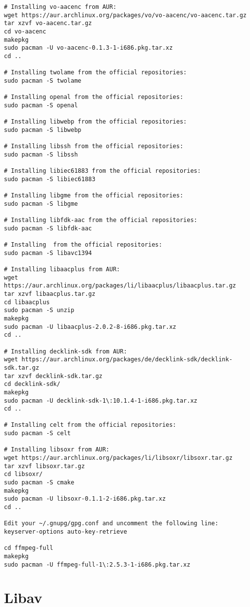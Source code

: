 \begin{itemize}
\begin{verbatim}
# Installing vo-aacenc from AUR:
wget https://aur.archlinux.org/packages/vo/vo-aacenc/vo-aacenc.tar.gz
tar xzvf vo-aacenc.tar.gz
cd vo-aacenc
makepkg
sudo pacman -U vo-aacenc-0.1.3-1-i686.pkg.tar.xz
cd ..

# Installing twolame from the official repositories:
sudo pacman -S twolame

# Installing openal from the official repositories:
sudo pacman -S openal

# Installing libwebp from the official repositories:
sudo pacman -S libwebp

# Installing libssh from the official repositories:
sudo pacman -S libssh

# Installing libiec61883 from the official repositories:
sudo pacman -S libiec61883

# Installing libgme from the official repositories:
sudo pacman -S libgme

# Installing libfdk-aac from the official repositories:
sudo pacman -S libfdk-aac

# Installing  from the official repositories:
sudo pacman -S libavc1394

# Installing libaacplus from AUR:
wget https://aur.archlinux.org/packages/li/libaacplus/libaacplus.tar.gz
tar xzvf libaacplus.tar.gz
cd libaacplus
sudo pacman -S unzip
makepkg
sudo pacman -U libaacplus-2.0.2-8-i686.pkg.tar.xz
cd ..

# Installing decklink-sdk from AUR:
wget https://aur.archlinux.org/packages/de/decklink-sdk/decklink-sdk.tar.gz
tar xzvf decklink-sdk.tar.gz
cd decklink-sdk/
makepkg
sudo pacman -U decklink-sdk-1\:10.1.4-1-i686.pkg.tar.xz
cd ..

# Installing celt from the official repositories:
sudo pacman -S celt

# Installing libsoxr from AUR:
wget https://aur.archlinux.org/packages/li/libsoxr/libsoxr.tar.gz
tar xzvf libsoxr.tar.gz
cd libsoxr/
sudo pacman -S cmake
makepkg
sudo pacman -U libsoxr-0.1.1-2-i686.pkg.tar.xz
cd ..

Edit your ~/.gnupg/gpg.conf and uncomment the following line:
keyserver-options auto-key-retrieve

cd ffmpeg-full
makepkg
sudo pacman -U ffmpeg-full-1\:2.5.3-1-i686.pkg.tar.xz
\end{verbatim}

\end{itemize}



\section{Libav}

